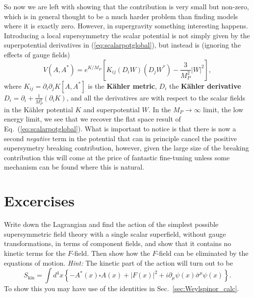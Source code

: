\documentclass[notes.tex]{subfiles}
\begin{document}
So now we are left with showing that the contribution is very small but non-zero, which is in general thought to be a much harder problem than finding models where it  is exactly zero.
However, in supergravity something interesting happens. Introducing a local supersymmetry the scalar potential is not simply given by the superpotential derivatives in (\ref{eq:scalarpotglobal}), but instead is (ignoring the effects of gauge fields)
\begin{equation}
V(A,A^*) = e^{K/M_P}\left[K_{ij}(D_iW)(D_jW^*)-\frac{3}{M_P^2}|W|^2\right],
\end{equation}
where $K_{ij}=\partial_i\partial_jK[A,A^*]$ is the {\bf Kähler metric},  $D_i$ the {\bf Kähler derivative} $D_i = \partial_i +\frac{1}{M_P^2}(\partial_iK)$, and all the derivatives are with respect to the scalar fields in the Kähler potential $K$ and superpotential $W$. In the $M_P\to \infty$ limit, the low energy limit, we see that we recover the flat space result of Eq.~(\ref{eq:scalarpotglobal}). What is important to notice is that  there is now a second {\it negative} term in the potential that can in principle cancel the positive supersymetry breaking contribution, however, given the large size of the breaking contribution this will come at the price of fantastic fine-tuning unless some mechanism can be found where this is natural.



\section{Excercises}

\begin{Exercise}[]
\label{ex:simpleL}
Write down the Lagrangian and find the action of the simplest possible supersymmetric field theory with a single scalar superfield, without gauge transformations, in terms of component fields, and show that it contains no kinetic terms for the $F$-field. Then show how the $F$-field can be eliminated by the equations of motion. {\it Hint:} The kinetic part of the action will turn out to be
\begin{equation}
S_\text{kin}=\int d^4x \left\{-A^*(x)\square A(x)+|F(x)|^2+i\partial_\mu\psi(x)\bar\sigma^\mu\psi(x)\right\}.
\end{equation}
To show this you may have use of the identities in Sec.~\ref{sec:Weylspinor_calc}.
\end{Exercise}
\end{document}
